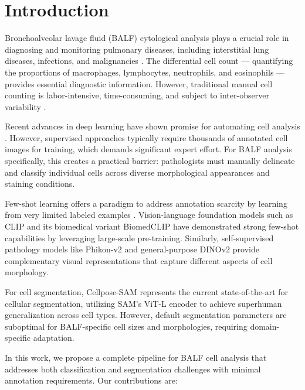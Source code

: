 \documentclass[preprint,review,12pt]{elsarticle}
\begin{document}
\section{Introduction}
\label{sec:intro}

Bronchoalveolar lavage fluid (BALF) cytological analysis plays a crucial role in diagnosing and monitoring pulmonary diseases, including interstitial lung diseases, infections, and malignancies \cite{meyer2012idiopathic}. The differential cell count --- quantifying the proportions of macrophages, lymphocytes, neutrophils, and eosinophils --- provides essential diagnostic information. However, traditional manual cell counting is labor-intensive, time-consuming, and subject to inter-observer variability \cite{meyer2012idiopathic}.

Recent advances in deep learning have shown promise for automating cell analysis \cite{tran2022deep}. However, supervised approaches typically require thousands of annotated cell images for training, which demands significant expert effort. For BALF analysis specifically, this creates a practical barrier: pathologists must manually delineate and classify individual cells across diverse morphological appearances and staining conditions.

Few-shot learning offers a paradigm to address annotation scarcity by learning from very limited labeled examples \cite{wang2020generalizing}. Vision-language foundation models such as CLIP \cite{radford2021clip} and its biomedical variant BiomedCLIP \cite{zhang2023biomedclip} have demonstrated strong few-shot capabilities by leveraging large-scale pre-training. Similarly, self-supervised pathology models like Phikon-v2 \cite{filiot2024phikon} and general-purpose DINOv2 \cite{oquab2024dinov2} provide complementary visual representations that capture different aspects of cell morphology.

For cell segmentation, Cellpose-SAM \cite{pachitariu2025cellpose} represents the current state-of-the-art for cellular segmentation, utilizing SAM's ViT-L encoder to achieve superhuman generalization across cell types. However, default segmentation parameters are suboptimal for BALF-specific cell sizes and morphologies, requiring domain-specific adaptation.

In this work, we propose a complete pipeline for BALF cell analysis that addresses both classification and segmentation challenges with minimal annotation requirements. Our contributions are:
\end{document}
